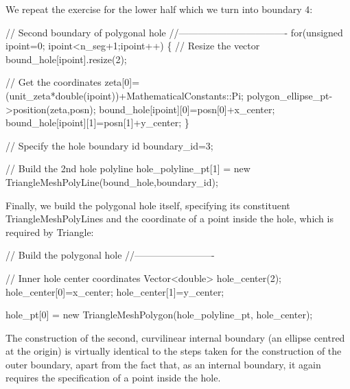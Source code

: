 We repeat the exercise for the lower half which we turn into boundary 4\+:


\begin{DoxyCodeInclude}
 

 \textcolor{comment}{// Second boundary of polygonal hole}
 \textcolor{comment}{//----------------------------------}
 \textcolor{keywordflow}{for}(\textcolor{keywordtype}{unsigned} ipoint=0; ipoint<n\_seg+1;ipoint++)
  \{
   \textcolor{comment}{// Resize the vector }
   bound\_hole[ipoint].resize(2);
   
   \textcolor{comment}{// Get the coordinates}
   zeta[0]=(unit\_zeta*double(ipoint))+MathematicalConstants::Pi;
   polygon\_ellipse\_pt->position(zeta,posn);
   bound\_hole[ipoint][0]=posn[0]+x\_center;
   bound\_hole[ipoint][1]=posn[1]+y\_center;
  \}
 
 \textcolor{comment}{// Specify the hole boundary id}
 boundary\_id=3;
 
 \textcolor{comment}{// Build the 2nd hole polyline}
 hole\_polyline\_pt[1] = \textcolor{keyword}{new} TriangleMeshPolyLine(bound\_hole,boundary\_id);

\end{DoxyCodeInclude}


Finally, we build the polygonal hole itself, specifying its constituent {\ttfamily Triangle\+Mesh\+Poly\+Lines} and the coordinate of a point inside the hole, which is required by {\ttfamily Triangle\+:} 


\begin{DoxyCodeInclude}


 \textcolor{comment}{// Build the polygonal hole }
 \textcolor{comment}{//-------------------------}
 
 \textcolor{comment}{// Inner hole center coordinates}
 Vector<double> hole\_center(2);
 hole\_center[0]=x\_center;
 hole\_center[1]=y\_center;

 hole\_pt[0] = \textcolor{keyword}{new} TriangleMeshPolygon(hole\_polyline\_pt, hole\_center);

\end{DoxyCodeInclude}


The construction of the second, curvilinear internal boundary (an ellipse centred at the origin) is virtually identical to the steps taken for the construction of the outer boundary, apart from the fact that, as an internal boundary, it again requires the specification of a point inside the hole.


